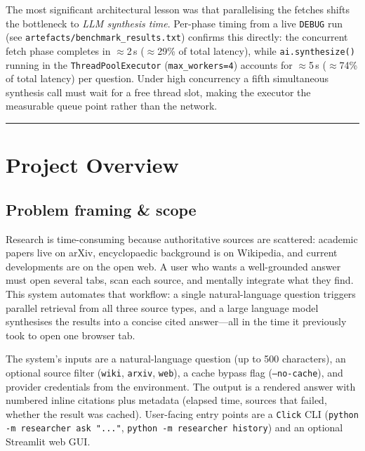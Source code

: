 \documentclass[11pt,a4paper]{article}
\begin{document}
The most significant architectural lesson was that parallelising the fetches shifts the
bottleneck to \emph{LLM synthesis time}. Per-phase timing from a live \texttt{DEBUG}
run (see \texttt{artefacts/benchmark\_results.txt}) confirms this directly: the
concurrent fetch phase completes in $\approx$2\,s ($\approx$29\% of total latency),
while \texttt{ai.synthesize()} running in the \texttt{ThreadPoolExecutor}
(\texttt{max\_workers=4}) accounts for $\approx$5\,s ($\approx$74\% of total latency)
per question. Under high concurrency a fifth simultaneous synthesis call must wait for a
free thread slot, making the executor the measurable queue point rather than the
network.

\tableofcontents
\vspace{0.6em}\hrule\vspace{0.4em}

\section{Project Overview}

\subsection{Problem framing \& scope}

Research is time-consuming because authoritative sources are scattered: academic papers
live on arXiv, encyclopaedic background is on Wikipedia, and current developments are
on the open web. A user who wants a well-grounded answer must open several tabs, scan
each source, and mentally integrate what they find. This system automates that
workflow: a single natural-language question triggers parallel retrieval from all three
source types, and a large language model synthesises the results into a concise cited
answer---all in the time it previously took to open one browser tab.

The system's inputs are a natural-language question (up to 500 characters), an optional
source filter (\texttt{wiki}, \texttt{arxiv}, \texttt{web}), a cache bypass flag
(\texttt{--no-cache}), and provider credentials from the environment. The output is a
rendered answer with numbered inline citations plus metadata (elapsed time, sources that
failed, whether the result was cached). User-facing entry points are a \texttt{Click}
CLI (\texttt{python -m researcher ask "..."}, \texttt{python -m researcher history})
and an optional Streamlit web GUI.
\end{document}
